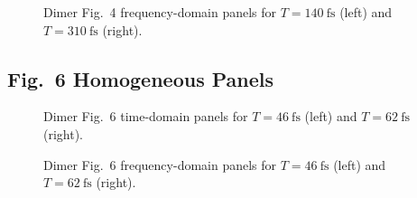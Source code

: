\begin{figure}[p]
    \centering
    \begin{minipage}[t]{0.49\linewidth}
        \centering
        \safeplaceholdergraphic[0.98\linewidth]{\dimerFigFourWaitOneFortyPaperPath}
    \end{minipage}\hfill
    \begin{minipage}[t]{0.49\linewidth}
        \centering
        \safeplaceholdergraphic[0.98\linewidth]{\dimerFigFourWaitThreeTenPaperPath}
    \end{minipage}
    \caption{Dimer Fig.~4 frequency-domain panels for $T=\SI{140}{\femto\second}$ (left) and $T=\SI{310}{\femto\second}$ (right).}
    \label{fig:app_dimer_fig4_freq_t140_t310}
\end{figure}

\subsection{Fig.~6 Homogeneous Panels}

\begin{figure}[p]
    \centering
    \begin{minipage}[t]{0.49\linewidth}
        \centering
        \safeplaceholdergraphic[0.98\linewidth]{\dimerFigSixWaitFortySixPaperTimePath}
    \end{minipage}\hfill
    \begin{minipage}[t]{0.49\linewidth}
        \centering
        \safeplaceholdergraphic[0.98\linewidth]{\dimerFigSixWaitSixtyTwoPaperTimePath}
    \end{minipage}
    \caption{Dimer Fig.~6 time-domain panels for $T=\SI{46}{\femto\second}$ (left) and $T=\SI{62}{\femto\second}$ (right).}
    \label{fig:app_dimer_fig6_time}
\end{figure}

\begin{figure}[p]
    \centering
    \begin{minipage}[t]{0.49\linewidth}
        \centering
        \safeplaceholdergraphic[0.98\linewidth]{\dimerFigSixWaitFortySixPaperPath}
    \end{minipage}\hfill
    \begin{minipage}[t]{0.49\linewidth}
        \centering
        \safeplaceholdergraphic[0.98\linewidth]{\dimerFigSixWaitSixtyTwoPaperPath}
    \end{minipage}
    \caption{Dimer Fig.~6 frequency-domain panels for $T=\SI{46}{\femto\second}$ (left) and $T=\SI{62}{\femto\second}$ (right).}
    \label{fig:app_dimer_fig6_freq}
\end{figure}

